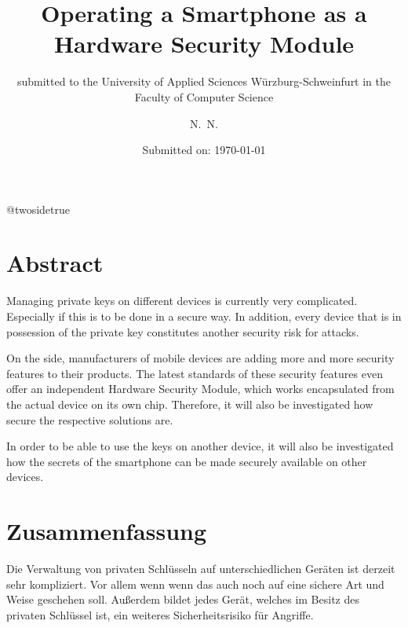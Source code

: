 \documentclass[12pt,oneside,a4paper,parskip]{scrbook}
\makeatletter
\def\BaAuthor{Achim Winter}
\def\BaAuthorStudyProgram{Computer Science}
\def\BaType{Bachelor thesis} %
\def\BaTitle{Operating a Smartphone as a Hardware Security Module}
\def\BaSupervisorOne{Prof.\ Dr.\ Junker-Schilling}
\def\BaSupervisorTwo{Prof.\ Dr.\ Huffstadt}
\def\BaDeadline{\today}
\def\ShowBaAuthor{\BaAuthor}
\def\ShowBaAuthor{N.~N.}
\newcommand*{\forcetwosidetitle}[1][1]{%
 \begingroup
   \cleardoubleoddpage
   \KOMAoptions{titlepage=true}%
   \csname @twosidetrue\endcsname
   \maketitle[{#1}]
 \endgroup
}
\makeatother
\begin{document}


\frontmatter
\titlehead{%
  {University of applied Sciences W\"{u}rzburg-Schweinfurt\\
   Faculty of Computer Science and Business Informatics}}
\subject{\BaType}
\title{\BaTitle\\[15mm]}
\subtitle{\normalsize{submitted to the University of Applied Sciences W\"{u}rzburg-Schweinfurt in the Faculty of \BaAuthorStudyProgram}}
\author{\ShowBaAuthor}
\date{\normalsize{Submitted on: \BaDeadline}}
\publishers{
  \normalsize{First Supervisor: \BaSupervisorOne}\\
  \normalsize{Second Supervisor: \BaSupervisorTwo}\\
}

\forcetwosidetitle



\section*{Abstract}
Managing private keys on different devices is currently very complicated. Especially if this is to be done in a secure way. In addition, every device that is in possession of the private key constitutes another security risk for attacks. 

On the side, manufacturers of mobile devices are adding more and more security features to their products. The latest standards of these security features even offer an independent Hardware Security Module, which works encapsulated from the actual device on its own chip. Therefore, it will also be investigated how secure the respective solutions are.

In order to be able to use the keys on another device, it will also be investigated how the secrets of the smartphone can be made securely available on other devices. 



\section*{Zusammenfassung}
Die Verwaltung von privaten Schlüsseln auf unterschiedlichen Geräten ist derzeit sehr kompliziert. Vor allem wenn wenn das auch noch auf eine sichere Art und Weise geschehen soll. Außerdem bildet jedes Gerät, welches im Besitz des privaten Schlüssel ist, ein weiteres Sicherheitsrisiko für Angriffe. 
\end{document}
